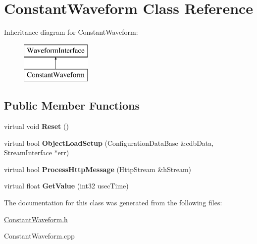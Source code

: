\hypertarget{classConstantWaveform}{
\section{ConstantWaveform Class Reference}
\label{classConstantWaveform}
}
Inheritance diagram for ConstantWaveform:\begin{figure}[H]
\begin{center}
\leavevmode
\includegraphics[height=2.000000cm]{classConstantWaveform}
\end{center}
\end{figure}
\subsection*{Public Member Functions}
\begin{DoxyCompactItemize}
\item 
\hypertarget{classConstantWaveform_a166066a7ab0b916babf93204028960b2}{
virtual void {\bfseries Reset} ()}
\label{classConstantWaveform_a166066a7ab0b916babf93204028960b2}

\item 
\hypertarget{classConstantWaveform_abc4f775c3b201a12e679b7a190820bfb}{
virtual bool {\bfseries ObjectLoadSetup} (ConfigurationDataBase \&cdbData, StreamInterface $\ast$err)}
\label{classConstantWaveform_abc4f775c3b201a12e679b7a190820bfb}

\item 
\hypertarget{classConstantWaveform_a9dcbac26e69bd407cff94e7cbd32cc39}{
virtual bool {\bfseries ProcessHttpMessage} (HttpStream \&hStream)}
\label{classConstantWaveform_a9dcbac26e69bd407cff94e7cbd32cc39}

\item 
\hypertarget{classConstantWaveform_a05df91e7d445cc903f950f40b4915ba4}{
virtual float {\bfseries GetValue} (int32 usecTime)}
\label{classConstantWaveform_a05df91e7d445cc903f950f40b4915ba4}

\end{DoxyCompactItemize}


The documentation for this class was generated from the following files:\begin{DoxyCompactItemize}
\item 
\hyperlink{ConstantWaveform_8h}{ConstantWaveform.h}\item 
ConstantWaveform.cpp\end{DoxyCompactItemize}

